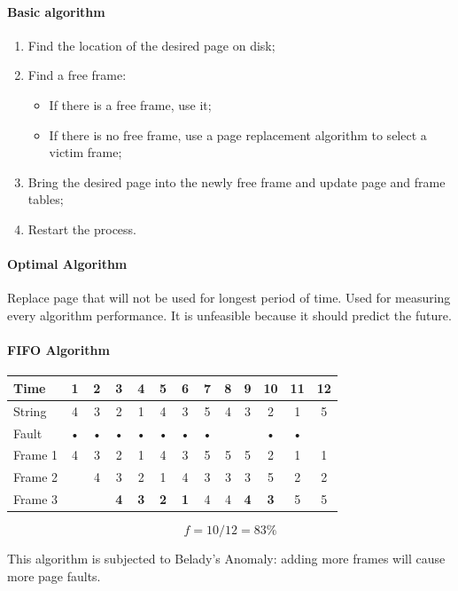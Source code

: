 \paragraph{Basic algorithm}
\begin{enumerate}
\item Find the location of the desired page on disk;
\item Find a free frame:
\begin{itemize}
\item If there is a free frame, use it;
\item If there is no free frame, use a page replacement algorithm to select a victim frame;
\end{itemize}
\item Bring the desired page into the newly free frame and update page and frame tables;
\item Restart the process.
\end{enumerate}

\paragraph{Optimal Algorithm}
Replace page that will not be used for longest period of time. Used for measuring every algorithm performance. It is unfeasible because it should predict the future.

\paragraph{FIFO Algorithm}
\begin{center}
\begin{tabular}{l|cccccccccccc}
\hline
Time & 1 & 2 & 3 & 4 & 5 & 6 & 7 & 8 & 9 & 10 & 11 & 12 \\
\hline
String & 4 & 3 & 2 & 1 & 4 & 3 & 5 & 4 & 3 & 2 & 1 & 5 \\
\hline
Fault & • & • & • & • & • & • & • &  &  & • & • &  \\
\hline
Frame 1 & 4 & 3 & 2 & 1 & 4 & 3 & 5 & 5 & 5 & 2 & 1 & 1 \\
Frame 2 & & 4 & 3 & 2 & 1 & 4 & 3 & 3 & 3 & 5 & 2 & 2 \\
Frame 3 &  &  & \textbf{4} & \textbf{3} & \textbf{2} & \textbf{1} & 4 & 4 & \textbf{4} & \textbf{3} & 5 & 5 \\
\hline
\end{tabular}
\[ f = 10/12 = 83 \% \]
\end{center}
This algorithm is subjected to Belady's Anomaly: adding more frames will cause more page faults.

